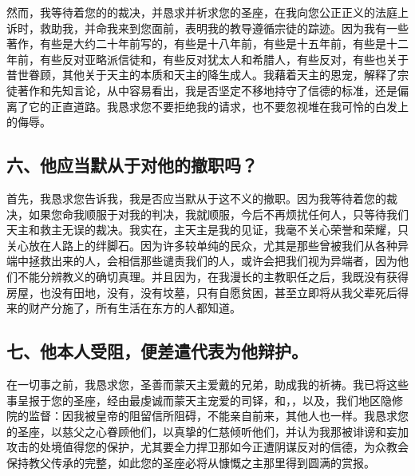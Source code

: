 然而，我等待着您的的裁决，并恳求并祈求您的圣座，在我向您公正正义的法庭上诉时，救助我，并命我来到您面前，表明我的教导遵循宗徒的踪迹。因为我有一些著作，有些是大约二十年前写的，有些是十八年前，有些是十五年前，有些是十二年前，有些反对亚略派信徒和，有些反对犹太人和希腊人，有些反对，有些也关于普世眷顾，其他关于天主的本质和天主的降生成人。我藉着天主的恩宠，解释了宗徒著作和先知言论，从中容易看出，我是否坚定不移地持守了信德的标准，还是偏离了它的正直道路。我恳求您不要拒绝我的请求，也不要忽视堆在我可怜的白发上的侮辱。\par


\subsection{六、他应当默从于对他的撤职吗？}

首先，我恳求您告诉我，我是否应当默从于这不义的撤职。因为我等待着您的裁决，如果您命我顺服于对我的判决，我就顺服，今后不再烦扰任何人，只等待我们天主和救主无误的裁决。我实在，主天主是我的见证，我毫不关心荣誉和荣耀，只关心放在人路上的绊脚石。因为许多较单纯的民众，尤其是那些曾被我们从各种异端中拯救出来的人，会相信那些谴责我们的人，或许会把我们视为异端者，因为他们不能分辨教义的确切真理。并且因为，在我漫长的主教职任之后，我既没有获得房屋，也没有田地，没有，没有坟墓，只有自愿贫困，甚至立即将从我父辈死后得来的财产分施了，所有生活在东方的人都知道。\par


\subsection{七、他本人受阻，便差遣代表为他辩护。}

在一切事之前，我恳求您，圣善而蒙天主爱戴的兄弟，助成我的祈祷。我已将这些事呈报于您的圣座，经由最虔诚而蒙天主宠爱的司铎，和，，以及，我们地区隐修院的监督：因我被皇帝的阻留信所阻碍，不能亲自前来，其他人也一样。我恳求您的圣座，以慈父之心眷顾他们，以真挚的仁慈倾听他们，并认为我那被诽谤和妄加攻击的处境值得您的保护，尤其要全力捍卫那如今正遭阴谋反对的信德，为众教会保持教父传承的完整，如此您的圣座必将从慷慨之主那里得到圆满的赏报。\par

